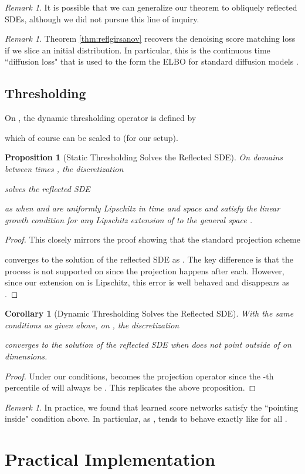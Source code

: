 \documentclass{article}
\theoremstyle{plain}
\newtheorem{proposition}[theorem]{Proposition}
\newtheorem{corollary}[theorem]{Corollary}
\theoremstyle{definition}
\theoremstyle{remark}
\newtheorem{remark}[theorem]{Remark}
\begin{document}
\begin{remark}
    It is possible that we can generalize our theorem to obliquely reflected SDEs, although we did not pursue this line of inquiry.
\end{remark}

\begin{remark}
    Theorem \ref{thm:reflgirsanov} recovers the denoising score matching loss if we slice an initial  distribution. In particular, this is the continuous time ``diffusion loss"  that is used to the form the ELBO for standard diffusion models  \citep{Kingma2021VariationalDM, Ho2020DenoisingDP}.
\end{remark}

\subsection{Thresholding}\label{sec:app:theory:thresh}

On , the dynamic thresholding operator is defined by

which of course can be scaled to  (for our setup).
\begin{proposition}[Static Thresholding Solves the Reflected SDE]
    On domains  between times , the discretization
    
    solves the reflected SDE
    
    as  when  and  are uniformly Lipschitz in time and space and satisfy the linear growth condition for any Lipschitz extension of  to the general space .
\end{proposition}

\begin{proof}
    This closely mirrors the proof showing that the standard projection scheme
    
    converges to the solution of the reflected SDE as  \citep{Skorokhod1961StochasticEF, Schuss2013BrownianDA, Liu1993NumericalAT}. The key difference is that the process is not supported on  since the projection happens after each. However, since our extension on  is Lipschitz, this error is well behaved and disappears as .
\end{proof}

\begin{corollary}[Dynamic Thresholding Solves the Reflected SDE]
    With the same conditions as given above, on , the discretization
    
    converges to the solution of the reflected SDE when  does not point outside of  on  dimensions.
\end{corollary}
\begin{proof}
    Under our conditions,  becomes the projection operator since the -th percentile of  will always be . This replicates the above proposition.
\end{proof}
\begin{remark}
    In practice, we found that learned score networks  satisfy the ``pointing inside" condition above. In particular, as ,  tends to behave exactly like  for all .
\end{remark} \section{Practical Implementation}
\end{document}
